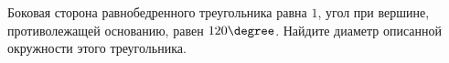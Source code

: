 \begin{ex}
	\begin{condition}
		Боковая сторона равнобедренного треугольника равна \( 1 \), угол при вершине, противолежащей основанию, равен \( 120\degree\). Найдите диаметр описанной окружности этого треугольника.
	\end{condition}
\end{ex}